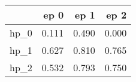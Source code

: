 \begin{tabular}{lrrr}
\toprule
{} &   ep 0 &   ep 1 &   ep 2 \\
\midrule
hp\_0 &  0.111 &  0.490 &  0.000 \\
hp\_1 &  0.627 &  0.810 &  0.765 \\
hp\_2 &  0.532 &  0.793 &  0.750 \\
\bottomrule
\end{tabular}
